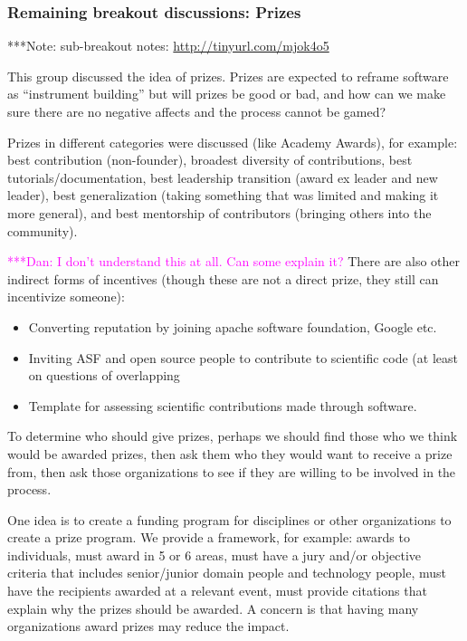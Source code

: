 \documentclass[11pt, oneside]{amsart}
\newcommand{\note}[1]{ {\textcolor{blueish}    { ***Note:      #1 }}}
\newcommand{\katznote}[1]{ {\textcolor{magenta}    { ***Dan:      #1 }}}
\begin{document}
\subsubsection{Remaining breakout discussions: Prizes}\label{sec:prizes}
\note{sub-breakout notes: \url{http://tinyurl.com/mjok4o5}}

This group discussed the idea of prizes.  Prizes are expected to reframe software
as ``instrument building'' but will prizes be good or bad, and how can we make sure
there are no negative affects and the process cannot be gamed?
  
Prizes in different categories were discussed (like Academy Awards), for example:
best contribution (non-founder),
broadest diversity of contributions,
best tutorials/documentation,
best leadership transition (award ex leader and new leader),
best generalization (taking something that was limited and making it more general), and
best mentorship of contributors (bringing others into the community).
 
\katznote{I don't understand this at all.  Can some explain it?}
There are also other indirect forms of incentives
(though these are not a direct prize, they still can incentivize someone):
\begin{itemize}
\item Converting reputation by joining apache software foundation, Google etc. 
\item Inviting ASF and open source people to contribute to scientific code (at least on questions of overlapping
\item Template for assessing scientific contributions made through software.   
\end{itemize}

To determine who should give prizes, perhaps we should find those who we think would
be awarded prizes, then ask them who they would want to receive a prize from, then
ask those organizations to see if they are willing to be involved in the process.

One idea is to create a funding program for disciplines or other organizations to
create a prize program.  We provide a framework, for example: awards to individuals, must
award in 5 or 6 areas, must have a jury and/or objective criteria that includes
senior/junior domain people and technology people, must have the recipients awarded
at a relevant event, must provide citations that explain why the prizes should be awarded.
A concern is that having many organizations award prizes may reduce the impact.
\end{document}

